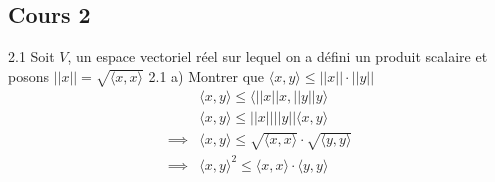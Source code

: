 \documentclass[12pt]{book}
\theoremstyle{definition}
\begin{document}
\subsection{Cours 2}
2.1 Soit $V$, un espace vectoriel réel sur lequel on a défini un produit scalaire et posons $||x|| = \sqrt{\langle x, x \rangle}$
2.1 a) Montrer que $\langle x, y \rangle \leq ||x|| \cdot ||y||$
\begin{align*}
    & \langle x, y \rangle \leq \langle ||x||x, ||y||y \rangle  \\
    & \langle x, y \rangle \leq ||x||||y||\langle x, y \rangle \\
    \implies & \langle x, y \rangle \leq \sqrt{\langle x, x \rangle} \cdot \sqrt{\langle y, y \rangle} \\
    \implies & \langle x, y \rangle^2 \leq \langle x, x \rangle \cdot \langle y, y \rangle \\
\end{align*}
\end{document}

